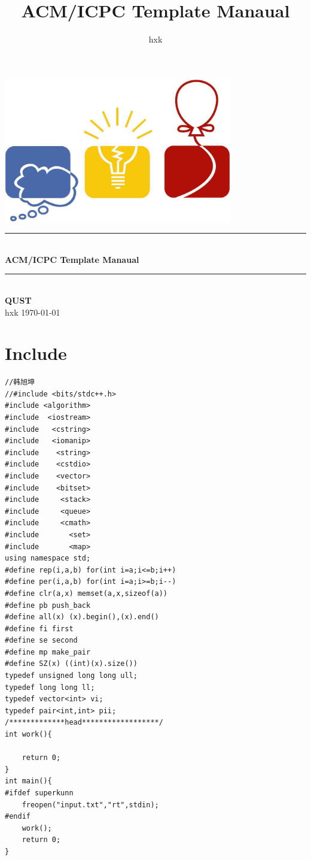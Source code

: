 \documentclass[twoside]{article}
\title{ACM/ICPC Template Manaual}
\author{hxk}
\newcommand{\HRule}{\rule{\linewidth}{0.5mm}}
\begin{document}
\small
\begin{titlepage}
\begin{center}
\vspace*{0.5cm}\includegraphics[width=0.75\textwidth]{logo.jpg} \\ [2cm]
\HRule \\ [1cm]
\textbf{\Huge{ACM/ICPC Template Manaual}} \\ [0.5cm]
\HRule \\ [4cm]
\textbf{\Huge{QUST}} \\ [1cm]
\LARGE{hxk}
\vfill
\Large{\today}
\end{center}
\clearpage
\end{titlepage}
\tableofcontents\clearpage
\pagestyle{fancy}
\lfoot{}
\cfoot{\thepage}\rfoot{}
\setcounter{section}{-1}
\setcounter{page}{1}
\clearpage\section{Include}
\begin{lstlisting}
//韩旭坤
//#include <bits/stdc++.h>
#include <algorithm>
#include  <iostream>
#include   <cstring>
#include   <iomanip>
#include    <string>
#include    <cstdio>
#include    <vector>
#include    <bitset>
#include     <stack>
#include     <queue>
#include     <cmath>
#include       <set>
#include       <map>
using namespace std;
#define rep(i,a,b) for(int i=a;i<=b;i++)
#define per(i,a,b) for(int i=a;i>=b;i--)
#define clr(a,x) memset(a,x,sizeof(a))
#define pb push_back
#define all(x) (x).begin(),(x).end()
#define fi first
#define se second
#define mp make_pair
#define SZ(x) ((int)(x).size())
typedef unsigned long long ull;
typedef long long ll;
typedef vector<int> vi;
typedef pair<int,int> pii;
/*************head******************/
int work(){
    
    return 0;
}
int main(){
#ifdef superkunn
    freopen("input.txt","rt",stdin);
#endif
    work();
    return 0;
}
\end{lstlisting}
\end{document}
